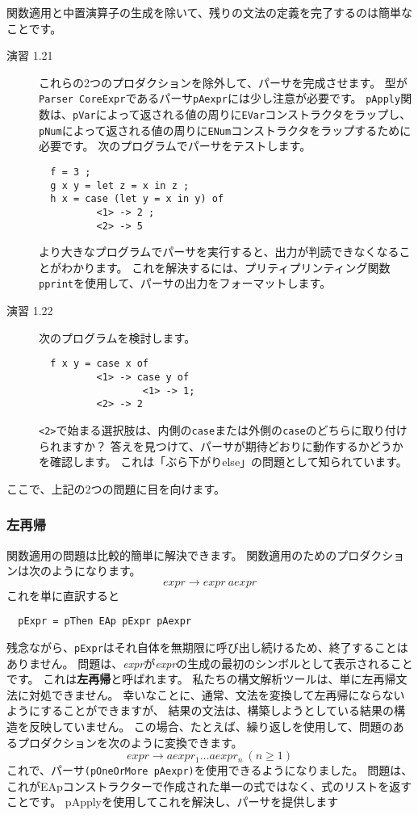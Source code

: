 \documentclass{jarticle}
\begin{document}
関数適用と中置演算子の生成を除いて、残りの文法の定義を完了するのは簡単なことです。

\begin{description}
	\item[演習 1.21] これらの2つのプロダクションを除外して、パーサを完成させます。
	      型が\texttt{Parser CoreExpr}であるパーサ\texttt{pAexpr}には少し注意が必要です。
	      \texttt{pApply}関数は、\texttt{pVar}によって返される値の周りに\texttt{EVar}コンストラクタをラップし、
	      \texttt{pNum}によって返される値の周りに\texttt{ENum}コンストラクタをラップするために必要です。
	      次のプログラムでパーサをテストします。

	      \begin{verbatim}
  f = 3 ;
  g x y = let z = x in z ;
  h x = case (let y = x in y) of
          <1> -> 2 ;
          <2> -> 5
\end{verbatim}

	      より大きなプログラムでパーサを実行すると、出力が判読できなくなることがわかります。
	      これを解決するには、プリティプリンティング関数\texttt{pprint}を使用して、パーサの出力をフォーマットします。
	\item[演習 1.22] 次のプログラムを検討します。

	      \begin{verbatim}
  f x y = case x of
          <1> -> case y of
                  <1> -> 1;
          <2> -> 2
\end{verbatim}

	      \texttt{<2>}で始まる選択肢は、内側の\texttt{case}または外側の\texttt{case}のどちらに取り付けられますか？
	      答えを見つけて、パーサが期待どおりに動作するかどうかを確認します。
	      これは「ぶら下がりelse」の問題として知られています。
\end{description}

ここで、上記の2つの問題に目を向けます。

\subsubsection{左再帰}

関数適用の問題は比較的簡単に解決できます。
関数適用のためのプロダクションは次のようになります。
\[ expr \rightarrow expr ~ aexpr \]
これを単に直訳すると

\begin{verbatim}
  pExpr = pThen EAp pExpr pAexpr
\end{verbatim}

残念ながら、\texttt{pExpr}はそれ自体を無期限に呼び出し続けるため、終了することはありません。
問題は、\textit{expr}が\textit{expr}の生成の最初のシンボルとして表示されることです。
これは\textbf{左再帰}と呼ばれます。
私たちの構文解析ツールは、単に左再帰文法に対処できません。
幸いなことに、通常、文法を変換して左再帰にならないようにすることができますが、
結果の文法は、構築しようとしている結果の構造を反映していません。
この場合、たとえば、繰り返しを使用して、問題のあるプロダクションを次のように変換できます。
\[ expr \rightarrow aexpr_1 \ldots aexpr_n ~ (n \geq 1) \]
これで、パーサ\texttt{(pOneOrMore pAexpr)}を使用できるようになりました。
問題は、これがEApコンストラクターで作成された単一の式ではなく、式のリストを返すことです。
pApplyを使用してこれを解決し、パーサを提供します
\end{document}
